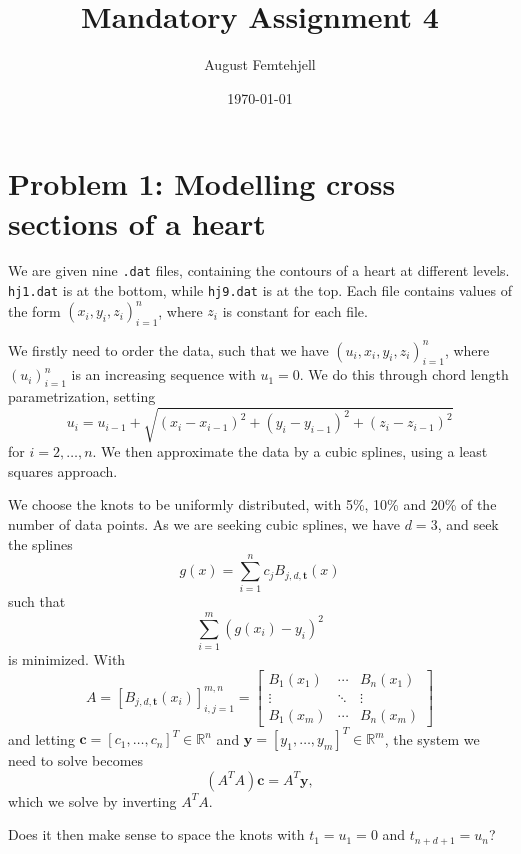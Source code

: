 \documentclass[a4paper,12pt]{article}
\title{Mandatory Assignment 4}
\author{August Femtehjell}
\date{\today}
\begin{document}
\maketitle

\section{Problem 1: Modelling cross sections of a heart}
We are given nine \verb|.dat| files, containing the contours of a heart at different levels.
\verb|hj1.dat| is at the bottom, while \verb|hj9.dat| is at the top.
Each file contains values of the form $(x_i, y_i, z_i)_{i = 1}^n$, where $z_i$ is constant for each file.

We firstly need to order the data, such that we have $(u_i, x_i, y_i, z_i)_{i = 1}^n$, where $(u_i)_{i = 1}^n$ is an increasing sequence with $u_1 = 0$.
We do this through chord length parametrization, setting
\begin{equation}
    u_i = u_{i - 1} + \sqrt{
        (x_i - x_{i - 1})^2 + (y_i - y_{i - 1})^2 + (z_i - z_{i - 1})^2
    }
\end{equation}
for $i = 2, \ldots, n$.
We then approximate the data by a cubic splines, using a least squares approach.

We choose the knots to be uniformly distributed, with 5\%, 10\% and 20\% of the number of data points.
As we are seeking cubic splines, we have $d = 3$, and seek the splines
\begin{equation}
    g(x) = \sum_{i = 1}^{n} c_j B_{j, d, \mathbf{t}}(x)
\end{equation}
such that
\begin{equation}
    \sum_{i = 1}^{m} \left( g(x_i) - y_i \right)^2
\end{equation}
is minimized.
With
\begin{equation}
    A
    = \left[ B_{j, d, \mathbf{t}}(x_i) \right]_{i,j = 1}^{m,n}
    =
    \begin{bmatrix}
        B_1(x_1) & \cdots & B_n(x_1) \\
        \vdots & \ddots & \vdots \\
        B_1(x_m) & \cdots & B_n(x_m)
    \end{bmatrix}
\end{equation}
and letting $\mathbf{c} = [c_1, \ldots, c_n]^T \in \mathbb{R}^n$ and $\mathbf{y} = [y_1, \ldots, y_m]^T \in \mathbb{R}^m$, the system we need to solve becomes
\begin{equation}
    (A^T A) \mathbf{c} = A^T \mathbf{y},
\end{equation}
which we solve by inverting $A^T A$.

Does it then make sense to space the knots with $t_1 = u_1 = 0$ and $t_{n+d+1} = u_n$?
\end{document}
